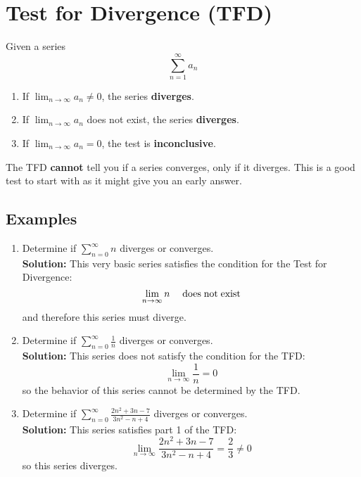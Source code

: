 \documentclass[12pt]{report}
\begin{document}
\section{Test for Divergence (TFD)}
Given a series
    $$\sum_{n=1}^\infty a_n$$

\begin{enumerate}
	\item If $ \lim_{n\to\infty} a_n \neq 0 $, the series \textbf{diverges}.
	\item If $ \lim_{n\to\infty} a_n $ does not exist, the series \textbf{diverges}.
	\item If $ \lim_{n\to\infty} a_n = 0 $, the test is \textbf{inconclusive}.
\end{enumerate}

\noindent The TFD \textbf{cannot} tell you if a series converges, only if it diverges. This is a good test to start with as it might give you an early answer.

\subsection*{Examples}
\begin{enumerate}

    \item Determine if $ \sum_{n=0}^{\infty} n $ diverges or converges. \\
    
    \textbf{Solution:} This very basic series satisfies the condition for the Test for Divergence:
        $$\lim_{n\to\infty} n \quad \text{\;does\;not\;exist}$$
    and therefore this series must diverge.




    \item Determine if $ \sum_{n=0}^{\infty} \frac{1}{n} $ diverges or converges. \\ 
    
    \textbf{Solution:} This series does not satisfy the condition for the TFD:
        $$\lim_{n\to\infty} \frac{1}{n} = 0$$
    so the behavior of this series cannot be determined by the TFD.
    
    
    
    \item Determine if $ \sum_{n=0}^{\infty} \frac{2n^2 + 3n - 7}{3n^2 - n + 4} $ diverges or converges. \\
    
    \textbf{Solution:} This series satisfies part 1 of the TFD:
    	$$ \lim_{n\to\infty} \frac{2n^2 + 3n - 7}{3n^2 - n + 4} = \frac{2}{3} \neq 0 $$
    so this series diverges. 
\end{enumerate}
\end{document}
